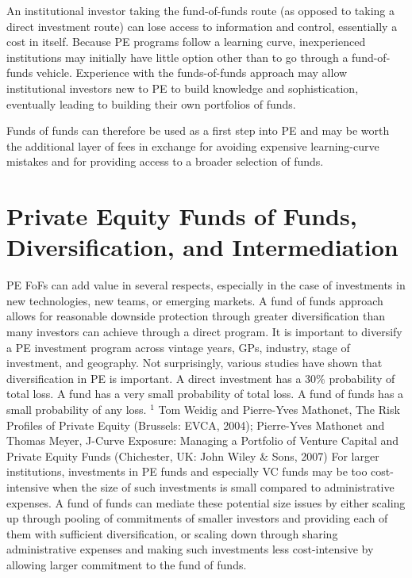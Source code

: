\documentclass[11pt]{article}
\begin{document}
An institutional investor taking the fund-of-funds route (as opposed to taking a direct investment route) can lose access to information and control, essentially a cost in itself. Because PE programs follow a learning curve, inexperienced institutions may initially have little option other than to go through a fund-of-funds vehicle. Experience with the funds-of-funds approach may allow institutional investors new to PE to build knowledge and sophistication, eventually leading to building their own portfolios of funds.

Funds of funds can therefore be used as a first step into PE and may be worth the additional layer of fees in exchange for avoiding expensive learning-curve mistakes and for providing access to a broader selection of funds.

\section*{Private Equity Funds of Funds, Diversification, and Intermediation}
PE FoFs can add value in several respects, especially in the case of investments in new technologies, new teams, or emerging markets. A fund of funds approach allows for reasonable downside protection through greater diversification than many investors can achieve through a direct program. It is important to diversify a PE investment program across vintage years, GPs, industry, stage of investment, and geography. Not surprisingly, various studies have shown that diversification in PE is important. A direct investment has a $30 \%$ probability of total loss. A fund has a very small probability of total loss. A fund of funds has a small probability of any loss. ${ }^{1}$ Tom Weidig and Pierre-Yves Mathonet, The Risk Profiles of Private Equity (Brussels: EVCA, 2004); Pierre-Yves Mathonet and Thomas Meyer, J-Curve Exposure: Managing a Portfolio of Venture Capital and Private Equity Funds (Chichester, UK: John Wiley \& Sons, 2007) For larger institutions, investments in PE funds and especially VC funds may be too cost-intensive when the size of such investments is small compared to administrative expenses. A fund of funds can mediate these potential size issues by either scaling up through pooling of commitments of smaller investors and providing each of them with sufficient diversification, or scaling down through sharing administrative expenses and making such investments less cost-intensive by allowing larger commitment to the fund of funds.
\end{document}

